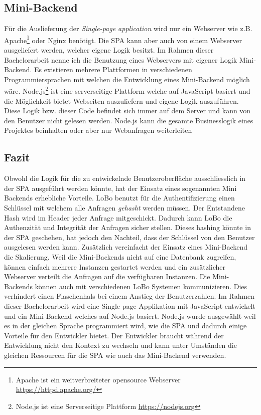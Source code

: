 \subsection{Mini-Backend}
Für die Auslieferung der \textit{Single-page application} wird nur ein Webserver wie z.B. Apache\footnote{Apache ist ein weitverbreiteter opensource Webserver \url{https://httpd.apache.org/}} oder Nginx benötigt. Die SPA kann aber auch von einem Webserver ausgeliefert werden, welcher eigene Logik besitzt. Im Rahmen dieser Bachelorarbeit nenne ich die Benutzung eines Webservers mit eigener Logik Mini-Backend. Es existieren mehrere Plattformen in verschiedenen Programmiersprachen mit welchen die Entwicklung eines Mini-Backend möglich wäre.  Node.js\footnote{Node.js ist eine Serverseitige Plattform \url{https://nodejs.org}} ist eine serverseitige Plattform welche auf JavaScript basiert und die Möglichkeit bietet Webseiten auszuliefern und eigene Logik auszuführen. Diese Logik bzw. dieser Code befindet sich immer auf dem Server und kann von den Benutzer nicht gelesen werden. Node.js kann die gesamte Businesslogik eines Projektes beinhalten oder aber nur Webanfragen weiterleiten

\subsection{Fazit}
Obwohl die Logik für die zu entwickelnde Benutzeroberfläche ausschliesslich in der SPA ausgeführt werden könnte, hat der Einsatz eines sogenannten Mini Backends erhebliche Vorteile. LoBo benutzt für die Authentifizierung einen Schlüssel mit welchem alle Anfragen \textit{gehasht} werden müssen. Der Entstandene Hash wird im Header jeder Anfrage mitgeschickt. Dadurch kann LoBo die Authenzität und Integrität der Anfragen sicher stellen. Dieses hashing könnte in der SPA geschehen, hat jedoch den Nachteil, dass der Schlüssel von den Benutzer ausgelesen werden kann. Zusätzlich vereinfacht der Einsatz eines Mini-Backend die Skalierung. Weil die Mini-Backends nicht auf eine Datenbank zugreifen, können einfach mehrere Instanzen gestartet werden und ein zusätzlicher Webserver verteilt die Anfragen auf die verfügbaren Instanzen. Die Mini-Backends können auch mit verschiedenen LoBo Systemen kommunizieren. Dies verhindert einen Flaschenhals bei einem Anstieg der Benutzerzahlen. Im Rahmen dieser Bachelorarbeit wird eine Single-page Applikation mit JavaScript entwickelt und ein Mini-Backend welches auf Node.js basiert. Node.js wurde ausgewählt weil es in der gleichen Sprache programmiert wird, wie die SPA und dadurch einige Vorteile für den Entwickler bietet. Der Entwickler braucht während der Entwicklung nicht den Kontext zu wechseln und kann unter Umständen die gleichen Ressourcen für die SPA wie auch das Mini-Backend verwenden.

